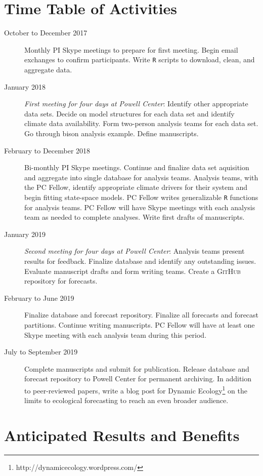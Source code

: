 \documentclass[12pt,]{article}
\let\rmarkdownfootnote\footnote%
\def\footnote{\protect\rmarkdownfootnote}
\begin{document}
\normalsize

\section{Time Table of Activities}\begin{description}

\item[October to December 2017] Monthly PI Skype meetings to prepare for first meeting. Begin email exchanges to confirm participants. Write \texttt{R} scripts to download, clean, and aggregate data.
\item[January 2018] \textit{First meeting for four days at Powell Center}: Identify other appropriate data sets. Decide on model structures for each data set and identify climate data availability. Form two-person analysis teams for each data set. Go through bison analysis example. Define manuscripts.
\item[February to December 2018] Bi-monthly PI Skype meetings. Continue and finalize data set aquisition and aggregate into single database for analysis teams. Analysis teams, with the PC Fellow, identify appropriate climate drivers for their system and begin fitting state-space models. PC Fellow writes generalizable \texttt{R} functions for analysis teams. PC Fellow will have Skype meetings with each analysis team as needed to complete analyses. Write first drafts of manuscripts.
\item[January 2019] \textit{Second meeting for four days at Powell Center}: Analysis teams present results for feedback. Finalize database and identify any outstanding issues. Evaluate manuscript drafts and form writing teams. Create a \textsc{GitHub} repository for forecasts.
\item[February to June 2019] Finalize database and forecast repository. Finalize all forecasts and forecast partitions. Continue writing manuscripts. PC Fellow will have at least one Skype meeting with each analysis team during this period.
\item[July to September 2019] Complete manuscripts and submit for publication. Release database and forecast repository to Powell Center for permanent archiving. In addition to peer-reviewed papers, write a blog post for Dynamic Ecology\footnote{http://dynamicecology.wordpress.com/} on the limits to ecological forecasting to reach an even broader audience.

\end{description}

\section{Anticipated Results and Benefits}
\end{document}

